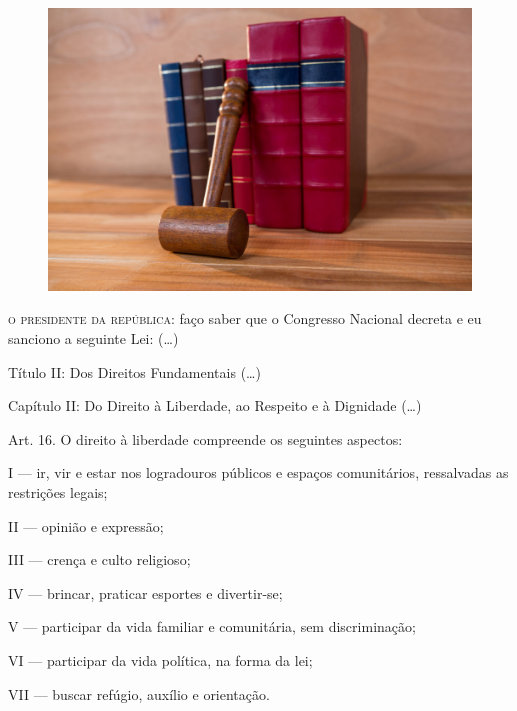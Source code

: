 \begin{myquote}

\begin{figure}[H]
\centering
\includegraphics[scale=0.25]{./imgSAEB_7_POR/media/image29.png}
\end{figure}

\textsc{o presidente da república}: faço saber que o Congresso Nacional decreta e
eu sanciono a seguinte Lei: (\ldots{})

Título II: Dos Direitos Fundamentais (\ldots{})

Capítulo II: Do Direito à Liberdade, ao Respeito e à Dignidade (\ldots{})

Art. 16. O direito à liberdade compreende os seguintes aspectos:

I --- ir, vir e estar nos logradouros públicos e espaços comunitários,
ressalvadas as restrições legais;

II --- opinião e expressão;

III --- crença e culto religioso;

IV --- brincar, praticar esportes e divertir-se;

V --- participar da vida familiar e comunitária, sem discriminação;

VI --- participar da vida política, na forma da lei;

VII --- buscar refúgio, auxílio e orientação. \\


\end{myquote}

